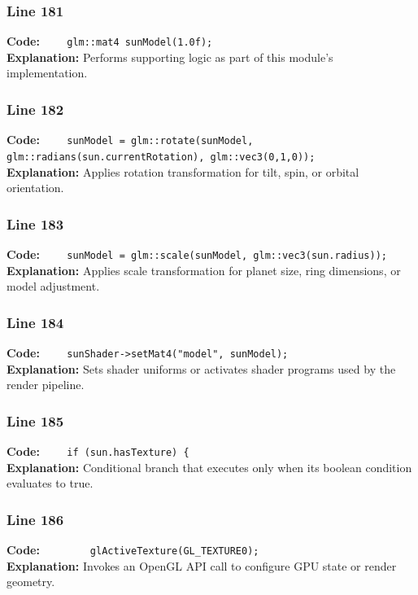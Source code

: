 \documentclass[11pt,a4paper]{article}
\begin{document}
\subsubsection*{Line 181}
\textbf{Code:} \verb|    glm::mat4 sunModel(1.0f);|\\
\textbf{Explanation:} Performs supporting logic as part of this module's implementation.

\subsubsection*{Line 182}
\textbf{Code:} \verb|    sunModel = glm::rotate(sunModel, glm::radians(sun.currentRotation), glm::vec3(0,1,0));|\\
\textbf{Explanation:} Applies rotation transformation for tilt, spin, or orbital orientation.

\subsubsection*{Line 183}
\textbf{Code:} \verb|    sunModel = glm::scale(sunModel, glm::vec3(sun.radius));|\\
\textbf{Explanation:} Applies scale transformation for planet size, ring dimensions, or model adjustment.

\subsubsection*{Line 184}
\textbf{Code:} \verb|    sunShader->setMat4("model", sunModel);|\\
\textbf{Explanation:} Sets shader uniforms or activates shader programs used by the render pipeline.

\subsubsection*{Line 185}
\textbf{Code:} \verb|    if (sun.hasTexture) {|\\
\textbf{Explanation:} Conditional branch that executes only when its boolean condition evaluates to true.

\subsubsection*{Line 186}
\textbf{Code:} \verb|        glActiveTexture(GL_TEXTURE0);|\\
\textbf{Explanation:} Invokes an OpenGL API call to configure GPU state or render geometry.
\end{document}
